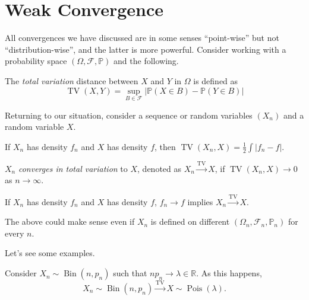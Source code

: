 \section{Weak Convergence}
All convergences we have discussed are in some senses ``point-wise'' but not ``distribution-wise'', and the latter is more powerful. Consider working with a probability space \((\Omega , \mathscr{F} , \mathbb{P} )\) and the following.

\begin{definition}\label{def:total-variation}
	The \emph{total variation} distance between \(X\) and \(Y\) in \(\Omega \) is defined as
	\[
		\operatorname{TV}(X, Y) = \sup_{B \in \mathscr{F} } \left\vert \mathbb{P} (X \in B) - \mathbb{P} (Y \in B) \right\vert
	\]
\end{definition}

Returning to our situation, consider a sequence or random variables \((X_n)\) and a random variable \(X\).

\begin{remark}
	If \(X_n\) has density \(f_n\) and \(X\) has density \(f\), then \(\operatorname{TV}(X_n, X) = \frac{1}{2} \int \vert f_n - f \vert \).
\end{remark}

\begin{definition}\label{def:convergence-in-total-variation}
	\(X_n\) \emph{converges in total variation} to \(X\), denoted as \(X_n \overset{\operatorname{TV}}{\to } X\), if \(\operatorname{TV}(X_n, X) \to 0\) as \(n \to \infty \).
\end{definition}

\begin{remark}
	If \(X_n\) has density \(f_n\) and \(X\) has density \(f\), \(f_n \to f\) implies \(X_n \overset{\operatorname{TV} }{\to } X\).
\end{remark}

\begin{note}
	The above could make sense even if \(X_n\) is defined on different \((\Omega _n , \mathscr{F} _n, \mathbb{P} _n)\) for every \(n\).
\end{note}

Let's see some examples.

\begin{eg}
	Consider \(X_n \sim \operatorname{Bin}(n, p_n) \) such that \(n p_n \to \lambda \in \mathbb{R} \). As this happens,
	\[
		X_n \sim \operatorname{Bin}(n, p_n)
		\overset{\operatorname{TV} }{\to } X \sim \operatorname{Pois}(\lambda ).
	\]
\end{eg}

